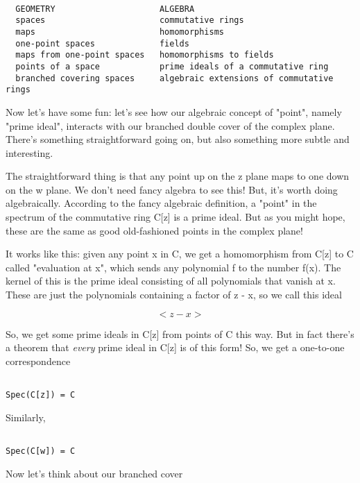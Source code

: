 \begin{verbatim}

  GEOMETRY                     ALGEBRA
  spaces                       commutative rings
  maps                         homomorphisms
  one-point spaces             fields
  maps from one-point spaces   homomorphisms to fields
  points of a space            prime ideals of a commutative ring
  branched covering spaces     algebraic extensions of commutative rings

\end{verbatim}
    
Now let's have some fun: let's see how our algebraic concept 
of "point",
namely "prime ideal", interacts with our branched double cover of the 
complex plane.   There's something straightforward going on, but also 
something more subtle and interesting.

The straightforward thing is that any point up on the z plane maps to one 
down on the w plane.  We don't need fancy algebra to see this!  But, it's
worth doing algebraically.  According to the fancy algebraic definition,
a "point" in the spectrum of the commutative ring C[z] is a prime 
ideal.  But as you might hope, these are the same as good old-fashioned points 
in the complex plane! 

It works like this: given any point x in C, we get a homomorphism from 
C[z] to C called "evaluation at x", which sends any polynomial f to 
the number f(x).  The kernel of this is the prime ideal consisting of 
all polynomials that vanish at x.  These are just the polynomials 
containing a factor of z - x, so we call this ideal 


$$

<z - x> 
$$
    

So, we get some prime ideals in C[z] from points of C this way.  But in 
fact there's a theorem that \emph{every} 
prime ideal in C[z] is of this form!  
So, we get a one-to-one correspondence


\begin{verbatim}

Spec(C[z]) = C
\end{verbatim}
    
Similarly, 


\begin{verbatim}

Spec(C[w]) = C
\end{verbatim}
    

Now let's think about our branched cover 


